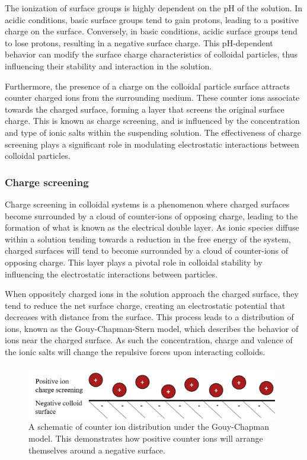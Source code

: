 The ionization of surface groups is highly dependent on the pH of the solution. In acidic conditions, basic surface groups tend to gain protons, leading to a positive charge on the surface. Conversely, in basic conditions, acidic surface groups tend to lose protons, resulting in a negative surface charge. This pH-dependent behavior can modify the surface charge characteristics of colloidal particles, thus influencing their stability and interaction in the solution.

Furthermore, the presence of a charge on the colloidal particle surface attracts counter charged ions from the surrounding medium. These counter ions associate towards the charged surface, forming a layer that screens the original surface charge. This is known as charge screening, and is influenced by the concentration and type of ionic salts within the suspending solution. The effectiveness of charge screening plays a significant role in modulating electrostatic interactions between colloidal particles.
\cite{babthes}%

\subsubsection{Charge screening}



Charge screening in colloidal systems is a phenomenon where charged surfaces become surrounded by a cloud of counter-ions of opposing charge, leading to the formation of what is known as the electrical double layer. As ionic species diffuse within a solution tending towards a reduction in the free energy of the system, charged surfaces will tend to become surrounded by a cloud of counter-ions of opposing charge. This layer plays a pivotal role in colloidal stability by influencing the electrostatic interactions between particles. 

When oppositely charged ions in the solution approach the charged surface, they tend to reduce the net surface charge, creating an electrostatic potential that decreases with distance from the surface. This process leads to a distribution of ions, known as the Gouy-Chapman-Stern model, which describes the behavior of ions near the charged surface. As such the concentration, charge and valence of the ionic salts will change the repulsive forces upon interacting colloids.\cite{?}

\begin{figure}[h]    
        \begin{center}
          \includegraphics[width=110mm]{chapter1/ioncloud.PNG}
\end{center}
\caption{A schematic of counter ion distribution under the Gouy-Chapman model. This demonstrates how positive counter ions will arrange themselves around a negative surface.}
\label{fig:ioncloud}                
\end{figure}

